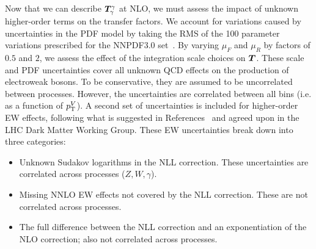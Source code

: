 Now that we can describe $\bm{T}^{\gamma}_{\gamma}$ at NLO, we must assess the impact of unknown higher-order terms on the transfer factors.
We account for variations caused by uncertainties in the PDF model by taking the RMS of the 100 parameter variations prescribed for the NNPDF3.0 set~\cite{nnpdf}.
By varying $\mu_F$ and $\mu_R$ by factors of $0.5$ and $2$, we assess the effect of the integration scale choices on $\bm{T}^{}_{}$.
These scale and PDF uncertainties cover all unknown QCD effects on the production of electroweak bosons.
To be conservative, they are assumed to be uncorrelated between processes.
However, the uncertainties are correlated between all bins (i.e. as a function of $p_\mathrm{T}^V$).
A second set of uncertainties is included for higher-order EW effects, following what is suggested in References~\cite{ewk5,ewk4,ewk6,ewk2,ewk3,ewk9,ewk8,ewk1,ewk7} and agreed upon in the LHC Dark Matter Working Group.
These EW uncertainties break down into three categories:
\begin{itemize}
    \item Unknown Sudakov logarithms in the NLL correction. These uncertainties are correlated across processes ($Z,W,\gamma$).
    \item Missing NNLO EW effects not covered by the NLL correction. These are not correlated across processes.
    \item The full difference between the NLL correction and an exponentiation of the NLO correction; also not correlated across processes.
\end{itemize}

